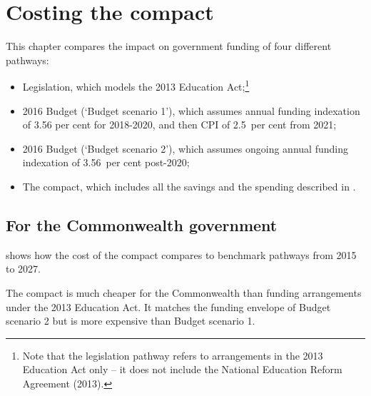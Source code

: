 \documentclass{grattan}
\begin{document}
\chapter{Costing the compact}\label{chap:costing-the-compact}


This chapter compares the impact on government funding of four different pathways:

\begin{itemize}
\item
  Legislation, which models the 2013 Education Act;\footnote{Note that the legislation pathway refers to arrangements in the 2013 Education Act only -- it does not include the National Education Reform Agreement (2013).}
\item
  2016 Budget (`Budget scenario 1'), which assumes annual funding indexation of 3.56 per cent for 2018-2020, and then CPI of 2.5~per cent from 2021;
\item
  2016 Budget (`Budget scenario 2'), which assumes ongoing annual funding indexation of 3.56~per cent post-2020;
\item
  The compact, which includes all the savings and the spending described in .
\end{itemize}

\section{For the Commonwealth government}\label{sec:for-the-commonwealth}

 shows how the cost of the compact compares to benchmark pathways from 2015 to 2027.

The compact is much cheaper for the Commonwealth than funding arrangements under the 2013 Education Act.
It matches the funding envelope of Budget scenario 2 but is more expensive than Budget scenario 1.
\end{document}

